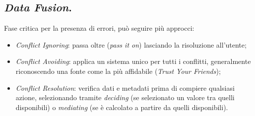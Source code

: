 \documentclass[a4page, 11pt]{article}
\begin{document}
\subsection{\textit{Data Fusion}.}
Fase critica per la presenza di errori, può seguire più approcci:
\begin{itemize}
\item \textit{Conflict Ignoring}: passa oltre (\textit{pass it on}) lasciando la risoluzione all'utente;
\item \textit{Conflict Avoiding}: applica un sistema unico per tutti i conflitti, generalmente riconoscendo una fonte come la più affidabile (\textit{Trust Your Friends});
  \item \textit{Conflict Resolution}: verifica dati e metadati prima di compiere qualsiasi azione, selezionando tramite \textit{deciding} (se selezionato un valore tra quelli disponibili) o \textit{mediating} (se è calcolato a partire da quelli disponibili).
\end{itemize}



\end{document}
